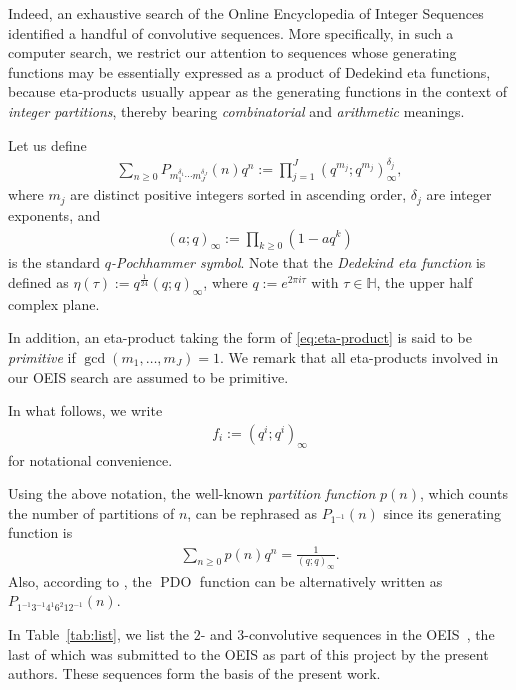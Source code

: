 \documentclass[12pt,reqno]{amsart}
\numberwithin{equation}{section}
\theoremstyle{plain}
\theoremstyle{definition}
\theoremstyle{named}
\newcommand{\PDO}{\operatorname{PDO}}
\begin{document}
Indeed, an exhaustive search of the Online Encyclopedia of Integer Sequences~\cite{OEIS} identified a handful of convolutive sequences. More specifically, in such a computer search, we restrict our attention to sequences whose generating functions may be essentially expressed as a product of Dedekind eta functions, because eta-products usually appear as the generating functions in the context of \emph{integer partitions}, thereby bearing  \emph{combinatorial} and \emph{arithmetic} meanings. 

Let us define
\begin{align}\label{eq:eta-product}
	\sum_{n\ge 0} P_{m_1^{\delta_1}\cdots m_{J}^{\delta_J}}(n) q^n := \prod_{j=1}^J (q^{m_j};q^{m_j})_{\infty}^{\delta_j},
\end{align}
where $m_j$ are distinct positive integers sorted in ascending order, $\delta_j$ are integer exponents, and
\begin{align*}
	(a;q)_\infty := \prod_{k\ge 0} (1-aq^k)
\end{align*}
is the standard \emph{$q$-Pochhammer symbol}. Note that the \emph{Dedekind eta function} is defined as $\eta(\tau) := q^{\frac{1}{24}}(q;q)_\infty$, where $q:=e^{2\pi i\tau}$ with $\tau\in \mathbb{H}$, the upper half complex plane.

In addition, an eta-product taking the form of \eqref{eq:eta-product} is said to be \emph{primitive} if $\gcd(m_1, \ldots, m_J) = 1$. We remark that all eta-products involved in our OEIS search are assumed to be primitive.

In what follows, we write
\begin{align*}
	f_i := (q^i;q^i)_\infty
\end{align*}  
for notational convenience.  

Using the above notation, the well-known \emph{partition function} $p(n)$, which counts the number of partitions of $n$, can be rephrased as $P_{1^{-1}}(n)$ since its generating function is
\begin{align*}
	\sum_{n\ge 0} p(n) q^n = \frac{1}{(q;q)_\infty}.
\end{align*}
Also, according to \cite[p.~52, eq.~(1.6)]{ALL2002}, the $\PDO$ function can be alternatively written as $P_{1^{-1}3^{-1}4^{1}6^{2}12^{-1}}(n)$.

In Table~\ref{tab:list}, we list the $2$- and $3$-convolutive sequences in the OEIS~\cite{OEIS}, the last of which was submitted to the OEIS as part of this project by the present authors. These sequences form the basis of the present work.
\end{document}
